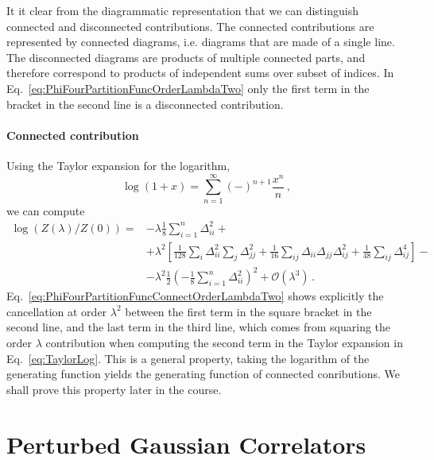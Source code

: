 \documentclass[notes.tex]{subfiles}
\begin{document}
It it clear from the diagrammatic representation that we can
distinguish connected and disconnected contributions. The connected
contributions are represented by connected diagrams, i.e. diagrams
that are made of a single line. The disconnected diagrams are products
of multiple connected parts, and therefore correspond to products of
independent sums over subset of indices. In
Eq.~\ref{eq:PhiFourPartitionFuncOrderLambdaTwo} only the first term in
the bracket in the second line is a disconnected contribution.

\paragraph{Connected contribution}

Using the Taylor expansion for the logarithm,
\begin{equation}
  \label{eq:TaylorLog}
  \log(1+x) = \sum_{n=1}^\infty (-)^{n+1} \frac{x^n}{n}\, ,
\end{equation}
we can compute
\begin{align}
  \label{eq:PhiFourPartitionFuncConnectOrderLambdaTwo}
  \log\left(Z(\lambda)/Z(0)\right) =
   & - \lambda \frac{1}{8} \sum_{i=1}^n \Delta_{ii}^2
  +\nonumber                                          \\
   & +\lambda^2
  \left[
    \frac{1}{128} \sum_i \Delta_{ii}^2 \sum_j \Delta_{jj}^2 +
    \frac{1}{16} \sum_{ij} \Delta_{ii} \Delta_{jj} \Delta_{ij}^2 +
    \frac{1}{48} \sum_{ij} \Delta_{ij}^4
    \right] -  \nonumber                              \\
   & - \lambda^2 \frac{1}{2} \left( - \frac{1}{8}
  \sum_{i=1}^n \Delta_{ii}^2\right)^2 +  \mathcal{O}(\lambda^3)\, .
\end{align}
Eq.~\ref{eq:PhiFourPartitionFuncConnectOrderLambdaTwo} shows
explicitly the cancellation at order $\lambda^2$ between the first
term in the square bracket in the second line, and the last term in
the third line, which comes from squaring the order $\lambda$
contribution when computing the second term in the Taylor expansion in
Eq.~\ref{eq:TaylorLog}. This is a general property, taking the
logarithm of the generating function yields the generating function of
connected conributions. We shall prove this property later in the
course.

\section{Perturbed Gaussian Correlators}
\label{sec:pert-gauss-corr}
\end{document}

